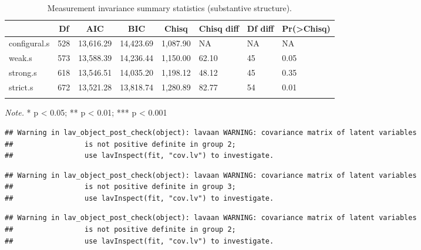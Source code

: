 \documentclass[
  english,
  man]{apa6}
\begin{document}
\begin{table}[tbp]

\begin{center}
\begin{threeparttable}

\caption{\label{tab:measinv.pilot.sub}Measurement invariance summary statistics (substantive structure).}

\begin{tabular}{llllllll}
\toprule
 & \multicolumn{1}{c}{Df} & \multicolumn{1}{c}{AIC} & \multicolumn{1}{c}{BIC} & \multicolumn{1}{c}{Chisq} & \multicolumn{1}{c}{Chisq diff} & \multicolumn{1}{c}{Df diff} & \multicolumn{1}{c}{Pr(>Chisq)}\\
\midrule
configural.s & 528 & 13,616.29 & 14,423.69 & 1,087.90 & NA & NA & NA\\
weak.s & 573 & 13,588.39 & 14,236.44 & 1,150.00 & 62.10 & 45 & 0.05\\
strong.s & 618 & 13,546.51 & 14,035.20 & 1,198.12 & 48.12 & 45 & 0.35\\
strict.s & 672 & 13,521.28 & 13,818.74 & 1,280.89 & 82.77 & 54 & 0.01\\
\bottomrule
\addlinespace
\end{tabular}

\begin{tablenotes}[para]
\normalsize{\textit{Note.} * p < 0.05; ** p < 0.01; *** p < 0.001}
\end{tablenotes}

\end{threeparttable}
\end{center}

\end{table}

\begin{verbatim}
## Warning in lav_object_post_check(object): lavaan WARNING: covariance matrix of latent variables
##                 is not positive definite in group 2;
##                 use lavInspect(fit, "cov.lv") to investigate.
\end{verbatim}

\begin{verbatim}
## Warning in lav_object_post_check(object): lavaan WARNING: covariance matrix of latent variables
##                 is not positive definite in group 3;
##                 use lavInspect(fit, "cov.lv") to investigate.
\end{verbatim}

\begin{verbatim}
## Warning in lav_object_post_check(object): lavaan WARNING: covariance matrix of latent variables
##                 is not positive definite in group 2;
##                 use lavInspect(fit, "cov.lv") to investigate.
\end{verbatim}
\end{document}
